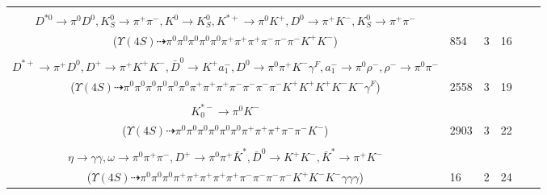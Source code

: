 \documentclass[landscape]{article}
\newcounter{rownumbers}
\newcommand\rn{\stepcounter{rownumbers}\arabic{rownumbers}}
\newcommand{\EOLP}{\\ \hline} %
\newcommand{\topoTags}[1]{#1} %
\begin{document}
\begin{longtable}{clcccc}
\rn & \makecell[l]{ $ 
\Upsilon(4S) \rightarrow B^{0} \bar{B}^{0} ,
B^{0} \rightarrow \bar{K}^{0} K^{*} \bar{D}^{0} ,
\bar{B}^{0} \rightarrow \pi^{0} D^{*0} ,
\bar{K}^{0} \rightarrow K_{S}^{0} ,
K^{*} \rightarrow \pi^{0} K^{0} ,
\bar{D}^{0} \rightarrow \pi^{0} \pi^{-} K^{*+} ,
$ \\ $
D^{*0} \rightarrow \pi^{0} D^{0} ,
K_{S}^{0} \rightarrow \pi^{+} \pi^{-} ,
K^{0} \rightarrow K_{S}^{0} ,
K^{*+} \rightarrow \pi^{0} K^{+} ,
D^{0} \rightarrow \pi^{+} K^{-} ,
K_{S}^{0} \rightarrow \pi^{+} \pi^{-} 
$ \\ ($
\Upsilon(4S) \dashrightarrow \pi^{0} \pi^{0} \pi^{0} \pi^{0} \pi^{0} \pi^{+} \pi^{+} \pi^{+} \pi^{-} \pi^{-} \pi^{-} K^{+} K^{-} 
$) } & \topoTags{854 & }3 & 16 \EOLP

\rn & \makecell[l]{ $ 
\Upsilon(4S) \rightarrow B^{0} \bar{B}^{0} ,
B^{0} \rightarrow \pi^{0} \pi^{-} K^{+} D^{*+} D^{*-} ,
\bar{B}^{0} \rightarrow \rho^{-} D^{*+} ,
D^{*+} \rightarrow \pi^{0} D^{+} ,
D^{*-} \rightarrow \pi^{-} \bar{D}^{0} ,
\rho^{-} \rightarrow \pi^{0} \pi^{-} ,
$ \\ $
D^{*+} \rightarrow \pi^{+} D^{0} ,
D^{+} \rightarrow \pi^{+} K^{+} K^{-} ,
\bar{D}^{0} \rightarrow K^{+} a_{1}^{-} ,
D^{0} \rightarrow \pi^{0} \pi^{+} K^{-} \gamma^{F} ,
a_{1}^{-} \rightarrow \pi^{0} \rho^{-} ,
\rho^{-} \rightarrow \pi^{0} \pi^{-} 
$ \\ ($
\Upsilon(4S) \dashrightarrow \pi^{0} \pi^{0} \pi^{0} \pi^{0} \pi^{0} \pi^{0} \pi^{+} \pi^{+} \pi^{+} \pi^{-} \pi^{-} \pi^{-} \pi^{-} K^{+} K^{+} K^{+} K^{-} K^{-} \gamma^{F} 
$) } & \topoTags{2558 & }3 & 19 \EOLP

\rn & \makecell[l]{ $ 
\Upsilon(4S) \rightarrow B^{0} \bar{B}^{0} ,
B^{0} \rightarrow \rho^{+} \eta D^{-} ,
\bar{B}^{0} \rightarrow \pi^{+} K_{0}^{*-} ,
\rho^{+} \rightarrow \pi^{0} \pi^{+} ,
\eta \rightarrow \pi^{0} \pi^{0} \pi^{0} ,
D^{-} \rightarrow \pi^{0} \pi^{+} \pi^{-} \pi^{-} ,
$ \\ $
K_{0}^{*-} \rightarrow \pi^{0} K^{-} 
$ \\ ($
\Upsilon(4S) \dashrightarrow \pi^{0} \pi^{0} \pi^{0} \pi^{0} \pi^{0} \pi^{0} \pi^{+} \pi^{+} \pi^{+} \pi^{-} \pi^{-} K^{-} 
$) } & \topoTags{2903 & }3 & 22 \EOLP

\rn & \makecell[l]{ $ 
\Upsilon(4S) \rightarrow B^{0} \bar{B}^{0} ,
B^{0} \rightarrow \rho^{+} D^{*-} \gamma ,
\bar{B}^{0} \rightarrow \rho^{0} \pi^{-} \eta \omega D^{+} ,
\rho^{+} \rightarrow \pi^{0} \pi^{+} ,
D^{*-} \rightarrow \pi^{-} \bar{D}^{0} ,
\rho^{0} \rightarrow \pi^{+} \pi^{-} ,
$ \\ $
\eta \rightarrow \gamma \gamma ,
\omega \rightarrow \pi^{0} \pi^{+} \pi^{-} ,
D^{+} \rightarrow \pi^{0} \pi^{+} \bar{K}^{*} ,
\bar{D}^{0} \rightarrow K^{+} K^{-} ,
\bar{K}^{*} \rightarrow \pi^{+} K^{-} 
$ \\ ($
\Upsilon(4S) \dashrightarrow \pi^{0} \pi^{0} \pi^{0} \pi^{+} \pi^{+} \pi^{+} \pi^{+} \pi^{+} \pi^{-} \pi^{-} \pi^{-} \pi^{-} K^{+} K^{-} K^{-} \gamma \gamma \gamma 
$) } & \topoTags{16 & }2 & 24 \EOLP


\end{longtable}
\end{document}
